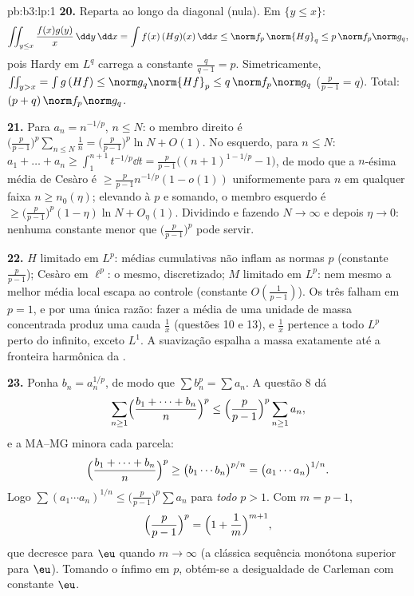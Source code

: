 \begin{solution}{pb:b3:lp:1}
\textbf{20.} Reparta ao longo da diagonal (nula). Em $\{y \leq
x\}$:
\[
\iint_{y\leq x}\frac{f(x)g(y)}{x}\,\dd y\,\dd x
= \int f(x)\,(Hg)(x)\,\dd x \leq \norm f_p\,\norm{Hg}_q
\leq p\,\norm f_p\norm g_q,
\]
pois Hardy em $L^q$ carrega a constante $\frac q{q-1} =
p$. Simetricamente, $\iint_{y>x} = \int g\,(Hf) \leq
\norm g_q\norm{Hf}_p \leq q\,\norm f_p\norm g_q$ ($\frac
p{p-1} = q$). Total: $(p + q)\,\norm f_p\norm g_q$.

\textbf{21.} Para $a_n = n^{-1/p}$, $n \leq N$: o membro
direito é $\bigl(\frac p{p-1}\bigr)^p\sum_{n\leq N}\frac1n =
\bigl(\frac p{p-1}\bigr)^p\ln N + O(1)$. No esquerdo, para $n
\leq N$: $a_1 + \dots + a_n \geq \int_1^{n+1}t^{-1/p}\dd t =
\frac{p}{p-1}\bigl((n+1)^{1-1/p} - 1\bigr)$, de modo que a $n$-ésima
média de Cesàro é $\geq \frac p{p-1}n^{-1/p}(1 -
o(1))$ uniformemente para $n$ em qualquer faixa $n \geq n_0(\eta)$;
elevando à $p$ e somando, o membro esquerdo é $\geq
\bigl(\frac p{p-1}\bigr)^p(1 - \eta)\ln N + O_\eta(1)$.
Dividindo e fazendo $N \to \infty$ e depois $\eta \to 0$: nenhuma
constante menor que $\bigl(\frac p{p-1}\bigr)^p$ pode servir.

\textbf{22.} $H$ limitado em $L^p$: médias cumulativas não
inflam as normas $p$ (constante $\frac p{p-1}$); Cesàro em
$\ell^p$: o mesmo, discretizado; $M$ limitado em $L^p$: nem
mesmo a melhor média local escapa ao controle (constante
$O(\frac1{p-1})$). Os três falham em $p = 1$, e por uma
única razão: fazer a média de uma unidade de massa concentrada produz uma
cauda $\frac1x$ (questões 10 e 13), e $\frac1x$ pertence
a todo $L^p$ perto do infinito, exceto $L^1$. A suavização espalha
a massa exatamente até a fronteira harmônica da .

\textbf{23.} Ponha $b_n = a_n^{1/p}$, de modo que $\sum b_n^p = \sum
a_n$. A questão 8 dá
\[
\sum_{n\geq1}\Bigl(\frac{b_1 + \dots + b_n}n\Bigr)^{p}
\leq \Bigl(\frac p{p-1}\Bigr)^{p}\sum_{n\geq1}a_n,
\]
e a MA--MG minora cada parcela:
\[
\Bigl(\frac{b_1 + \dots + b_n}n\Bigr)^{p}
\geq \bigl(b_1\cdots b_n\bigr)^{p/n}
= \bigl(a_1\cdots a_n\bigr)^{1/n}.
\]
Logo $\sum(a_1\cdots a_n)^{1/n} \leq \bigl(\frac
p{p-1}\bigr)^p\sum a_n$ para \emph{todo} $p > 1$. Com $m =
p - 1$,
\[
\Bigl(\frac p{p-1}\Bigr)^{p} =
\Bigl(1 + \frac1m\Bigr)^{m+1},
\]
que decresce para $\eu$ quando $m \to \infty$ (a clássica
sequência monótona superior para $\eu$). Tomando o ínfimo em
$p$, obtém-se a desigualdade de Carleman com constante $\eu$.


\end{solution}
